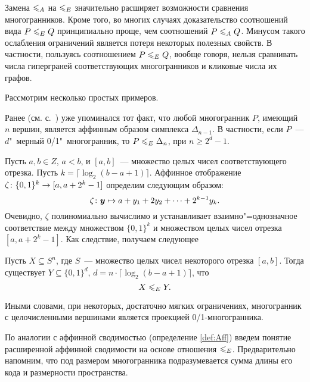 Замена $\leqslant_A$ на $\leqslant_E$ значительно расширяет возможности сравнения многогранников. Кроме того, во многих случаях доказательство соотношений вида $P \leqslant_E Q$ принципиально проще, чем соотношений $P \leqslant_A Q$.
Минусом такого ослабления ограничений является потеря некоторых полезных свойств.
В частности, пользуясь соотношением $P \leqslant_E Q$, вообще говоря, нельзя сравнивать числа гиперграней соответствующих многогранников и кликовые числа их графов.

Рассмотрим несколько простых примеров.

Ранее (см. с.~\pageref{ProjOfSimplex}) уже упоминался тот факт, что 
любой многогранник $P$, имеющий $n$ вершин, является аффинным образом симплекса $\Delta_{n-1}$. В частности, если $P$~--- $d$"~мерный 0/1"~многогранник, то
\(P \leqslant_E \Delta_{n}\), при $n \ge 2^d-1$.


Пусть $a,b \in Z$, $a < b$, и $[a,b]$~--- множество целых чисел соответствующего отрезка. Пусть $k = \lceil\log_2 (b-a+1)\rceil$.
Аффинное отображение $\zeta \colon \{0,1\}^k \to [a, a + 2^k - 1]$ определим следующим образом:
\begin{equation}
\label{eq:01toZ}
\zeta \colon \bm{y} \mapsto a + y_1 + 2 y_2 + \dots + 2^{k-1} y_k.
\end{equation}
Очевидно, $\zeta$ полиномиально вычислимо и устанавливает взаимно"=однозначное соответствие между множеством $\{0,1\}^k$ и множеством целых чисел отрезка $[a, a + 2^k - 1]$.
Как следствие, получаем следующее

\begin{prop}\label{prop:01}
Пусть $X \subseteq S^n$, где $S$~--- множество целых чисел некоторого отрезка $[a,b]$.
Тогда существует $Y \subseteq \{0,1\}^d$, $d = n \cdot \lceil\log_2 (b-a+1)\rceil$, что
\[
X \leqslant_E Y.
\]
\end{prop}

Иными словами, при некоторых, достаточно мягких ограничениях, многогранник с целочисленными вершинами является проекцией 0/1-многогранника.

По аналогии с аффинной сводимостью (определение \ref{def:Aff}) введем понятие расширенной аффинной сводимости на основе отношения $\leqslant_E$.
Предварительно напомним, что под размером многогранника подразумевается сумма длины его кода и размерности пространства.


